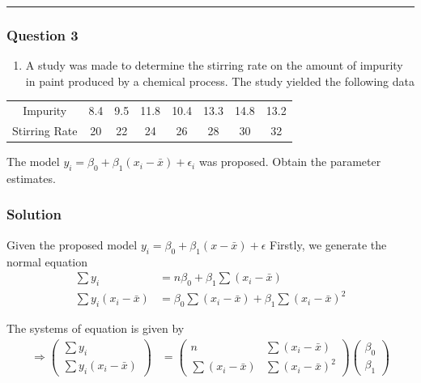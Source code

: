 \documentclass[
]{article}
\providecommand{\tightlist}{%
  \setlength{\itemsep}{0pt}\setlength{\parskip}{0pt}}
\begin{document}
\begin{center}\rule{0.5\linewidth}{0.5pt}\end{center}

\subsubsection{Question 3}\label{question-3}

\begin{enumerate}
\def\labelenumi{\alph{enumi}.}
\tightlist
\item
  A study was made to determine the stirring rate on the amount of
  impurity in paint produced by a chemical process. The study yielded
  the following data
\end{enumerate}

\begin{longtable}[]{@{}cccccccc@{}}
\toprule\noalign{}
\endhead
\bottomrule\noalign{}
\endlastfoot
Impurity & 8.4 & 9.5 & 11.8 & 10.4 & 13.3 & 14.8 & 13.2 \\
Stirring Rate & 20 & 22 & 24 & 26 & 28 & 30 & 32 \\
\end{longtable}

The model \(y_i = \beta_0 + \beta_1(x_i - \bar{x}) + \epsilon_i\) was
proposed. Obtain the parameter estimates.

\subsubsection{Solution}\label{solution-2}

Given the proposed model
\(y_i = \beta_0 +\beta_1(x - \bar{x}) + \epsilon\) Firstly, we generate
the normal equation \begin{align*}
      \sum y_i & = n\beta_0 + \beta_1 \sum (x_i - \bar{x}) \\
      \sum y_i (x_i - \bar{x}) & = \beta_0 \sum (x_i - \bar{x})  + \beta_1 \sum {(x_i - \bar{x})}^2
    \end{align*}

The systems of equation is given by \begin{align*}
  \Rightarrow
    \begin{pmatrix}
      \sum y_i \\
      \sum y_i (x_i - \bar{x})
    \end{pmatrix}
    & =
    \begin{pmatrix}
    n & \sum (x_i - \bar{x})\\
    \sum (x_i - \bar{x}) & \sum {(x_i - \bar{x})}^2
  \end{pmatrix}
  
  \begin{pmatrix}
    \beta_0\\
    \beta_1
  \end{pmatrix}
\end{align*}
\end{document}
